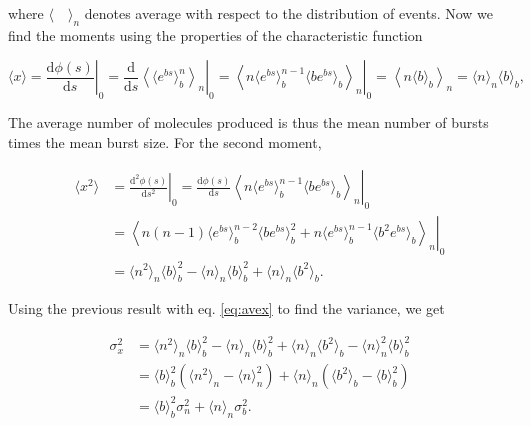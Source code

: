 where $\langle\quad\rangle_n$ denotes average with respect to the distribution of events. Now we find the moments using the properties of the characteristic function

\begin{equation}
  \label{eq:avex}
  \langle x\rangle = \left.\frac{\mathrm{d}\phi(s)}{\mathrm{d}s}\right|_0 = \left.\frac{\mathrm{d}}{\mathrm{d}s}\left\langle\langle e^{bs}\rangle_b^n\right\rangle_n\right|_0 = \left.\left\langle n\langle e^{bs}\rangle_b^{n-1}\langle b e^{bs}\rangle_b\right\rangle_n\right|_0 = \left\langle n\langle b\rangle_b\right\rangle_n = \langle n\rangle_n\langle b\rangle_b,
\end{equation}

The average number of molecules produced is thus the mean number of bursts times the mean burst size. For the second moment,

\begin{equation*}
  \begin{split}
    \langle x^2\rangle &= \left.\frac{\mathrm{d^2}\phi(s)}{\mathrm{d}s^2}\right|_0 = \left.\frac{\mathrm{d}\phi(s)}{\mathrm{d}s}\left\langle n\langle e^{bs}\rangle_b^{n-1}\langle b e^{bs}\rangle_b\right\rangle_n\right|_0\\
  &= \left.\left\langle n(n-1)\langle e^{bs}\rangle^{n-2}_b\langle be^{bs}\rangle^2_b+n\langle e^{bs}\rangle^{n-1}_b\langle b^2e^{bs}\rangle_b\right\rangle_n\right|_0\\
  &=\langle n^2\rangle_n\langle b\rangle_b^2-\langle n\rangle_n\langle b\rangle_b^2+\langle n\rangle_n\langle b^2\rangle_b.
  \end{split}
\end{equation*}

Using the previous result with eq. \eqref{eq:avex} to find the variance, we get

\begin{equation*}
  \begin{split}
    \sigma_x^2 &= \langle n^2\rangle_n\langle b\rangle_b^2-\langle n\rangle_n\langle b\rangle_b^2+\langle n\rangle_n\langle b^2\rangle_b - \langle n\rangle_n^2\langle b\rangle_b^2\\
    &=\langle b\rangle_b^2\left(\langle n^2\rangle_n-\langle n\rangle^2_n\right) + \langle n\rangle_n\left(\langle b^2\rangle_b-\langle b\rangle_b^2\right)\\
    &=\langle b\rangle_b^2\sigma_n^2 + \langle n\rangle_n\sigma_b^2.
  \end{split}
\end{equation*}

